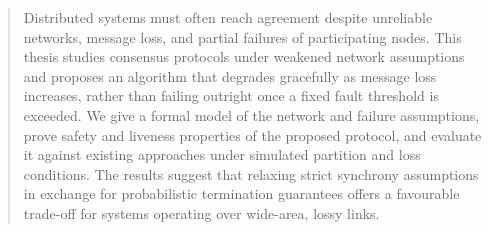 \begin{abstract}
Distributed systems must often reach agreement despite unreliable networks, message
loss, and partial failures of participating nodes. This thesis studies consensus
protocols under weakened network assumptions and proposes an algorithm that
degrades gracefully as message loss increases, rather than failing outright once a
fixed fault threshold is exceeded. We give a formal model of the network and
failure assumptions, prove safety and liveness properties of the proposed
protocol, and evaluate it against existing approaches under simulated partition and
loss conditions. The results suggest that relaxing strict synchrony assumptions in
exchange for probabilistic termination guarantees offers a favourable trade-off for
systems operating over wide-area, lossy links.
\end{abstract}
